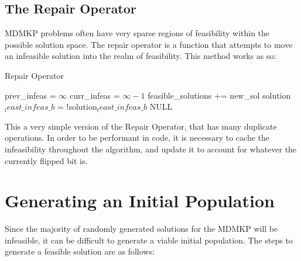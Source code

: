 \documentclass[11pt, letterpaper, onecolumn]{article}
\begin{document}
\subsection{The Repair Operator}

MDMKP problems often have very sparse regions of feasibility within the possible solution space. The repair operator is a function that attempts to move an infeasible solution into the realm of feasibility. This method works as so:  

\begin{algorithm}
\caption{Repair Operator}
\begin{algorithmic}
\STATE prev\_infeas = $\infty$
\STATE curr\_infeas = $\infty-1$
\STATE feasible\_solutions += new\_sol
\ENDIF
\ENDIF
\ENDFOR
{}
\ENDIF
\STATE solution$_least\_infeas\_b$ = !solution$_least\_infeas\_b$
\ENDWHILE
\RETURN NULL
\end{algorithmic}
\end{algorithm}

This a very simple version of the Repair Operator, that has many duplicate operations. In order to be performant in code, it is necessary to cache the infeasibility throughout the algorithm, and update it to account for whatever the currently flipped bit is. 

\section{Generating an Initial Population}

Since the majority of randomly generated solutions for the MDMKP will be infeasible, it can be difficult to generate a viable initial population. The steps to generate a feasible solution are as follows:
\end{document}
